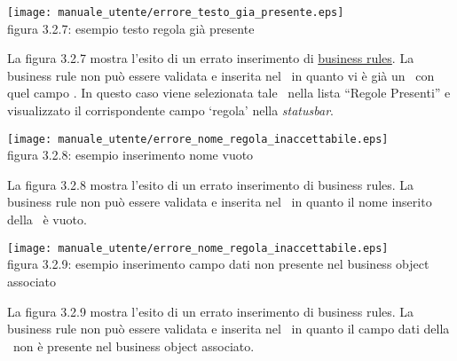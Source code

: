 \begin{center}
\texttt{[image: manuale\_utente/errore\_testo\_gia\_presente.eps]}\\
 figura 3.2.7: esempio testo regola gi\`a presente
\end{center} 
La figura 3.2.7 mostra l'esito di un errato inserimento di \underline{business rules}. La business rule non pu\`o essere validata e inserita nel \rp\ in quanto vi \`e gi\`a un \br\ con quel campo . In questo caso viene selezionata tale \br\ nella lista ``Regole Presenti'' e visualizzato il corrispondente campo `regola' nella \textit{statusbar}.

\begin{center}
\texttt{[image: manuale\_utente/errore\_nome\_regola\_inaccettabile.eps]}\\
 figura 3.2.8: esempio inserimento nome vuoto
\end{center} 
La figura 3.2.8 mostra l'esito di un errato inserimento di business rules. La business rule non pu\`o essere validata e inserita nel \rp\ in quanto il nome inserito  della \br\ \`e vuoto.

\begin{center}
\texttt{[image: manuale\_utente/errore\_nome\_regola\_inaccettabile.eps]}\\
 figura 3.2.9: esempio inserimento campo dati non presente nel business object associato
\end{center} 
La figura 3.2.9 mostra l'esito di un errato inserimento di business rules. La business rule non pu\`o essere validata e inserita nel \rp\ in quanto il campo dati della \br\ non \`e presente nel business object associato.


